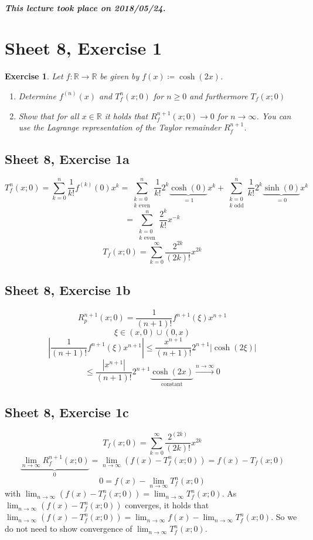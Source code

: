 \documentclass{article}
\newtheorem{ex}{Exercise} %
\newcommand{\card}[1]{\left|#1\right|}
\newcommand{\dateref}[1]{\paragraph{\textit{This lecture took place on #1.}}}
\begin{document}
\dateref{2018/05/24}

\section{Sheet 8, Exercise 1}
\begin{ex}
  Let $f: \mathbb R \to \mathbb R$ be given by $f(x) \coloneqq \cosh(2x)$.
  \begin{enumerate}
    \item Determine $f^{(n)}(x)$ and $T_f^n(x; 0)$ for $n \geq 0$ and furthermore $T_f(x; 0)$
    \item Show that for all $x \in \mathbb R$ it holds that $R_f^{n+1}(x; 0) \to 0$ for $n \to \infty$.
      You can use the Lagrange representation of the Taylor remainder $R_f^{n+1}$.
  \end{enumerate}
\end{ex}

\subsection{Sheet 8, Exercise 1a}
\[
  T_f^n(x; 0) = \sum_{k=0}^n \frac{1}{k!} f^{(k)}(0) x^k = \sum_{\substack{k=0 \\ k \text{ even}}}^n \frac{1}{k!} 2^k \underbrace{\operatorname{cosh}(0)}_{=1} x^k + \sum_{\substack{k=0 \\ k \text{ odd}}}^n \frac1{k!} 2^k \underbrace{\operatorname{sinh}(0)}_{= 0} x^k
\] \[
  = \sum_{\substack{k=0 \\ k \text{ even}}}^n \frac{2^k}{k!} x^{-k}
\] \[
  T_f(x; 0) = \sum_{k=0}^\infty \frac{2^{2k}}{(2k)!} x^{2k}
\]

\subsection{Sheet 8, Exercise 1b}
\[
  R_p^{n+1}(x; 0) = \frac{1}{(n+1)!} f^{n+1}(\xi) x^{n+1}
\] \[
  \xi \in (x, 0) \cup (0, x)
\] \[
  \card{\frac{1}{(n+1)!} f^{n+1}(\xi) x^{n+1}} \leq \frac{x^{n+1}}{(n+1)!} 2^{n+1} \card{\operatorname{cosh}(2\xi)}
\] \[
  \leq \frac{\card{x^{n+1}}}{(n+1)!} 2^{n+1} \underbrace{\operatorname{cosh}(2x)}_{\text{constant}} \xrightarrow{n \to \infty} 0
\]

\subsection{Sheet 8, Exercise 1c}
\[ T_f(x; 0) = \sum_{k=0}^\infty \frac{2^{(2k)}}{(2k)!} x^{2k} \]
\[ \underbrace{\lim_{n\to\infty} R_f^{n+1}(x; 0)}_{0} = \lim_{n\to\infty} (f(x) - T_f^n(x; 0)) = f(x) - T_f(x; 0) \]
\[ 0 = f(x) - \lim_{n\to\infty} T_f^n(x; 0) \]
with $\lim_{n\to\infty} (f(x) - T_f^n(x; 0)) = \lim_{n\to\infty} T_f^n(x; 0)$.
As $\lim_{n\to\infty} (f(x) - T_f^n(x; 0))$ converges, it holds that $\lim_{n\to\infty} (f(x) - T_f^n(x; 0)) = \lim_{n\to\infty} f(x) - \lim_{n\to\infty} T_f^n(x; 0)$. So we do not need to show convergence of $\lim_{n\to\infty} T_f^n(x; 0)$.
\end{document}
